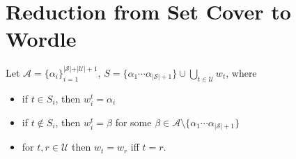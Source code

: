 \documentclass[10pt,a4paper]{article}
\begin{document}
\section{Reduction from Set Cover to Wordle}
Let $\mathcal{A}=\{\alpha_{i}\}^{\vert\mathcal{S}\vert+\vert \mathcal{U}\vert+1}_{i=1}$, $S= \{\alpha_1\cdots\alpha_{\vert\mathcal{S}\vert+1}\} \cup \bigcup_{t\in \mathcal{U}} w_t$, where 
\begin{itemize}
\item if $t\in S_i$, then $w^t_i = \alpha_i$
\item if $t\not  \in S_i $, then $w^t_i=\beta$ for some $\beta\in \mathcal{A}\setminus\{\alpha_1\cdots \alpha_{\vert\mathcal{S}\vert+1}\}$
\item for $t,r\in \mathcal{U}$ then $w_t = w_r$ iff $t=r.$
\end{itemize}
\end{document}
